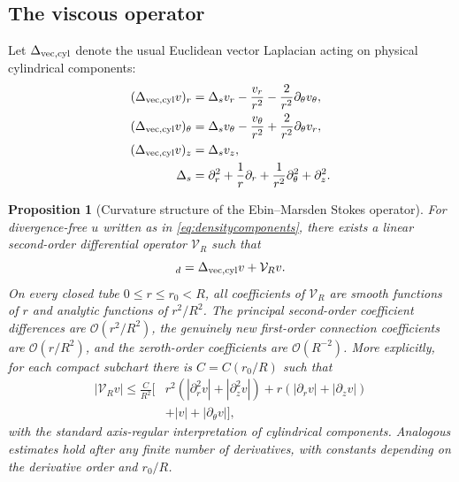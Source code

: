 \documentclass[aps,prd,reprint,superscriptaddress,nofootinbib,floatfix]{revtex4-2}
\newtheorem{proposition}[theorem]{Proposition}
\theoremstyle{definition}
\theoremstyle{remark}
\newcommand{\cL}{\mathcal{L}}
\newcommand{\cV}{\mathcal{V}}
\newcommand{\OO}{\mathcal{O}}
\begin{document}
\subsection{The viscous operator}

Let $\Delta_{\rm vec,cyl}$ denote the usual Euclidean vector Laplacian acting on physical cylindrical components:
\begin{align}
	(\Delta_{\rm vec,cyl}v)_r      & =\Delta_s v_r-\frac{v_r}{r^2}
	-\frac{2}{r^2}\partial_\theta v_\theta,\nonumber                                              \\
	(\Delta_{\rm vec,cyl}v)_\theta & =\Delta_s v_\theta-\frac{v_\theta}{r^2}
	+\frac{2}{r^2}\partial_\theta v_r,\nonumber                                                   \\
	(\Delta_{\rm vec,cyl}v)_z      & =\Delta_s v_z,\nonumber                                      \\
	\Delta_s                       & =\partial_r^2+\frac1r\partial_r+\frac1{r^2}\partial_\theta^2
	+\partial_z^2.\label{eq:veclap}
\end{align}

\begin{proposition}[Curvature structure of the Ebin--Marsden Stokes operator]\label{prop:viscous}
	For divergence-free $u$ written as in \cref{eq:densitycomponents}, there exists a linear second-order differential operator $\cV_R$ such that
	\begin{equation}
		[\cL_g u]_d=\Delta_{\rm vec,cyl}v+\cV_Rv.
		\label{eq:viscsplit}
	\end{equation}
	On every closed tube $0\le r\le r_0<R$, all coefficients of $\cV_R$ are smooth functions of $r$ and analytic functions of $r^2/R^2$. The principal second-order coefficient differences are $\OO(r^2/R^2)$, the genuinely new first-order connection coefficients are $\OO(r/R^2)$, and the zeroth-order coefficients are $\OO(R^{-2})$. More explicitly, for each compact subchart there is $C=C(r_0/R)$ such that
	\begin{align}
		|\cV_Rv|\le \frac{C}{R^2}\big[ & r^2(|\partial_r^2v|+|\partial_z^2v|)
		+r(|\partial_rv|+|\partial_zv|)\nonumber                              \\
		                               & +|v|+|\partial_\theta v|\big],
		\label{eq:Vbound}
	\end{align}
	with the standard axis-regular interpretation of cylindrical components. Analogous estimates hold after any finite number of derivatives, with constants depending on the derivative order and $r_0/R$.
\end{proposition}
\end{document}
